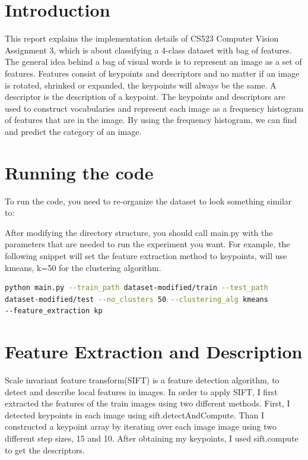 \section*{Introduction}

This report explains the implementation details of CS523 Computer Vision
Assignment 3, which is about classifying a 4-class dataset with bag of features.
The general idea behind a bag of visual words is to represent an image as a set
of features. Features consist of keypoints and descriptors and no matter if an
image is rotated, shrinked or expanded, the keypoints will always be the same. A
descriptor is the description of a keypoint. The keypoints and descriptors are
used to construct vocabularies and represent each image as a frequency histogram
of features that are in the image. By using the frequency histogram, we can
find and predict the category of an image.

\section*{Running the code}
To run the code, you need to re-organize the dataset to look something similar
to:


After modifying the directory structure, you should call main.py with the
parameters that are needed to run the experiment you want. For example, the
following snippet will set the feature extraction method to keypoints, will use
kmeans, k=50 for the clustering algorithm.


\begin{lstlisting}[language=Bash,title=Running the code,captionpos=b]
python main.py --train_path dataset-modified/train --test_path
dataset-modified/test --no_clusters 50 --clustering_alg kmeans
--feature_extraction kp

\end{lstlisting}


\newpage

\section*{Feature Extraction and Description}

Scale invariant feature transform(SIFT) is a feature detection algorithm, to
detect and describe local features in images. In order to apply SIFT, I first
extracted the features of the train images using two different methods. First, I
detected keypoints in each image using sift.detectAndCompute. Than I constructed
a keypoint array by iterating over each image image using two different step
sizes, 15 and 10. After obtaining my keypoints, I used sift.compute to get the
descriptors.


